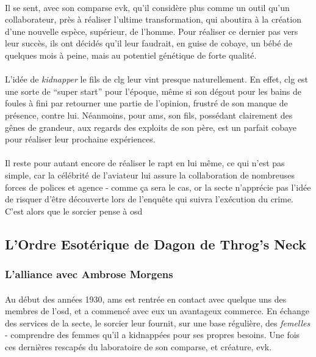 \paragraph{} Il se sent, avec son comparse \gls{evk}, qu'il considère plus comme un outil qu'un collaborateur, près à réaliser l'ultime transformation, qui aboutira à la création d'une nouvelle espèce, supérieur, de l'homme. Pour réaliser ce dernier pas vers leur succès, ils ont décidés qu'il leur faudrait, en guise de cobaye, un bébé de quelques mois à peine, mais au potentiel génétique de forte qualité. 
\paragraph{} L'idée de \emph{kidnapper} le fils de \gls{clg} leur vint presque naturellement. En effet, \gls{clg} est une sorte de ``super start''
pour l'époque, même si son dégout pour les bains de foules à fini par retourner une partie de l'opinion, frustré de son manque de présence, contre
lui. Néanmoins, pour \gls{ams}, son fils, possédant clairement des gênes de grandeur, aux regards des exploits de son père, est un parfait cobaye
pour réaliser leur prochaine expériences.
\paragraph{} Il reste pour autant encore de réaliser le rapt en lui même, ce qui n'est pas simple, car la célébrité de l'aviateur lui assure la
collaboration de nombreuses forces de polices et agence - comme ça sera le cas, or la secte n'apprécie pas l'idée de risquer d'être découverte
lors de l'enquête qui suivra l'exécution du crime. C'est alors que le sorcier pense à \gls{osd}

\subsection{L'Ordre Esotérique de Dagon de Throg's Neck}

\subsubsection{L'alliance avec Ambrose Morgens}

\paragraph{} Au début des années 1930, \gls{ams} est rentrée en contact avec quelque uns des membres
de l'\gls{osd}, et a commencé avec eux un avantageux commerce. En échange des services de la secte, 
le sorcier leur fournit, sur une base régulière, des \emph{femelles} - comprendre des femmes qu'il a 
kidnappées pour ses propres besoins. Une fois ces dernières rescapés du laboratoire de son comparse, et 
créature, \gls{evk}.

